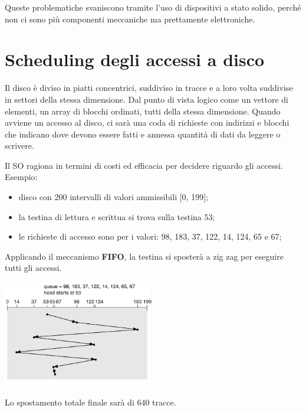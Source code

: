 \documentclass[a4paper, 12pt]{book}
\begin{document}
Queste problematiche svaniscono tramite l'uso di dispositivi
a stato solido, perché non ci sono più componenti meccaniche 
ma prettamente elettroniche.

\section{Scheduling degli accessi a disco}

Il disco è diviso in piatti concentrici, suddiviso in 
tracce e a loro volta suddivise in settori della stessa 
dimensione. Dal punto di vista logico come un vettore di 
elementi, un array di blocchi ordinati, tutti della stessa 
dimensione. Quando avviene un accesso al disco, ci sarà una 
coda di richieste con indirizzi e blocchi che indicano dove 
devono essere fatti e annessa quantità di dati da leggere 
o scrivere. 

Il SO ragiona in termini di costi ed efficacia per decidere
riguardo gli accessi. Esempio:
\begin{itemize}
    \item disco con 200 intervalli di valori ammissibili [0, 199];
    \item la testina di lettura e scrittua si trova sulla testina 53;
    \item le richieste di accesso sono per i valori: 98, 183, 37, 122, 14, 124, 65 e 67;
\end{itemize}
Applicando il meccanismo \textbf{FIFO}, la testina si sposterà a 
zig zag per eseguire tutti gli accessi.
\begin{center}
    \includegraphics[width=0.5\textwidth]{zigzag.png}
\end{center}
Lo spostamento totale finale sarà di 640 tracce.
\end{document}
